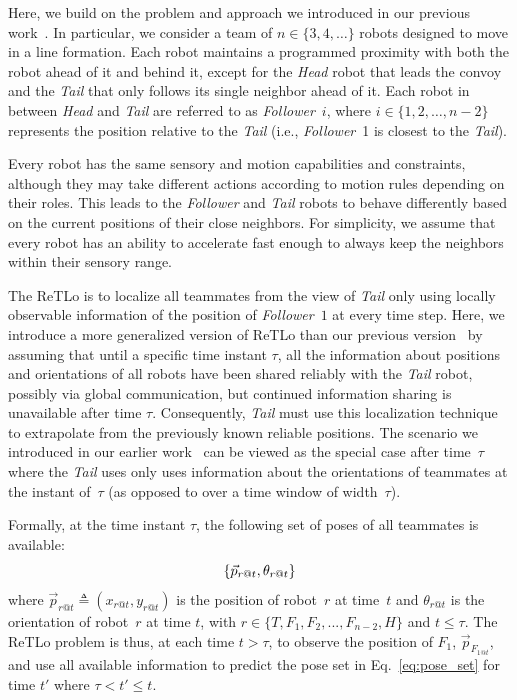 \documentclass[letterpaper, 10 pt, conference]{ieeeconf}  %
\begin{document}
    Here, we build on the problem and approach we introduced in our previous
    work~\cite{CPR17}. In particular, we consider a team of $n \in
    \{3,4,\dots\}$ robots designed to move in a line formation.
    Each robot maintains a programmed
    proximity with both the robot ahead of it and behind it, except for
    the \emph{Head} robot that leads the convoy and the \emph{Tail}
    that only follows its single neighbor ahead of it. Each robot in
    between \emph{Head} and \emph{Tail} are referred to as
    \emph{Follower}~$i$, where $i \in \{1, 2, \dots, n-2\}$ represents
    the position relative to the \emph{Tail} (i.e., \emph{Follower}~1 is
    closest to the \emph{Tail}).

    Every robot has the same sensory and motion capabilities and
    constraints, although they may take different actions according to
    motion rules depending on their roles. This leads to the
    \emph{Follower} and \emph{Tail} robots to behave differently based
    on the current positions of their close neighbors. For simplicity,
    we assume that every robot has an ability to accelerate fast enough
    to always keep the neighbors within their sensory range.

    The ReTLo is to localize all teammates from the view of \emph{Tail}
    only using locally observable information of the position
    of \emph{Follower}~$1$ at every time step. Here, we introduce a
    more generalized version of ReTLo than our previous
    version~\cite{CPR17} by assuming that until a specific time instant
    $\tau$, all the information about
    positions and orientations of all robots have been shared reliably 
    with the \emph{Tail} robot, possibly via global communication, but
    continued information sharing is unavailable after time $\tau$.
    Consequently, \emph{Tail} must use this localization technique to
    extrapolate from the previously known reliable positions. The
    scenario we introduced in our earlier work~\cite{CPR17} can be
    viewed as the special case after time~$\tau$ where
    the \emph{Tail} uses only uses information about the orientations of
    teammates at the instant of~$\tau$ (as opposed to over a time
    window of width~$\tau$).

    Formally, at the time instant $\tau$, the following set of poses of
    all teammates is available:
	\begin{equation}
		\{\vec{p}_{r@t},\theta_{r@t}\} \\
	    \label{eq:pose_set}
	\end{equation}
    where $\vec{p}_{r@t} \triangleq (x_{r@t}, y_{r@t})$ is the position
    of robot~$r$ at time~$t$ and $\theta_{r@t}$ is the orientation of
    robot~$r$ at time $t$, with $r \in \{T, F_{1}, F_{2}, ..., F_{n-2},
    H\}$ and $t \leq \tau$. The ReTLo problem is thus, at each time $t >
    \tau$, to observe the position of $F_1$, $\vec{p}_{F_{1@t}}$, and
    use all available information to predict the pose set in
    Eq.~\eqref{eq:pose_set} for time $t'$ where $ \tau < t' \leq t$.
\end{document}
